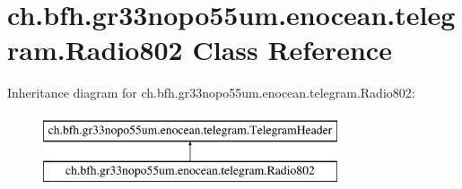 \hypertarget{classch_1_1bfh_1_1gr33nopo55um_1_1enocean_1_1telegram_1_1_radio802}{}\section{ch.\+bfh.\+gr33nopo55um.\+enocean.\+telegram.\+Radio802 Class Reference}
\label{classch_1_1bfh_1_1gr33nopo55um_1_1enocean_1_1telegram_1_1_radio802}
Inheritance diagram for ch.\+bfh.\+gr33nopo55um.\+enocean.\+telegram.\+Radio802\+:\begin{figure}[H]
\begin{center}
\leavevmode
\includegraphics[height=2.000000cm]{classch_1_1bfh_1_1gr33nopo55um_1_1enocean_1_1telegram_1_1_radio802}
\end{center}
\end{figure}
